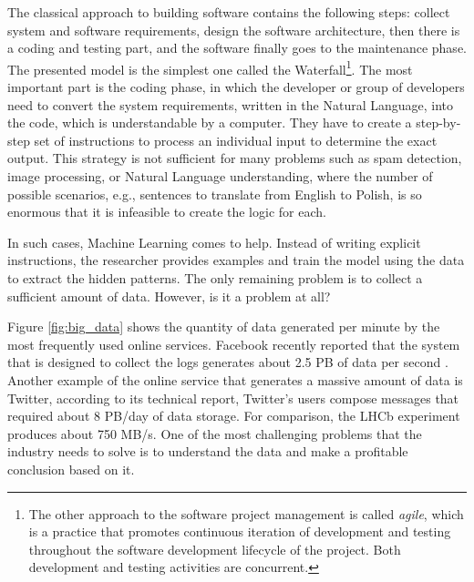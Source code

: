 The classical approach to building software contains the following steps: collect system and software requirements,
design the software architecture, then there is a coding and testing part, and the software finally goes to the maintenance phase. The presented model is the simplest one called the Waterfall\footnote{The other approach to the software project management is called \textit{agile}, which is a practice that promotes continuous iteration of development and testing throughout the software development lifecycle of the project. Both development and testing activities are concurrent.}. The most important part is the coding phase, in which the developer or group of developers need to convert the system requirements, written in the Natural Language, into the code, which is understandable by a computer. They have to create a step-by-step set of instructions to process an individual input to determine the exact output. 
This strategy is not sufficient for many problems such as spam detection, image processing, or Natural Language understanding, where the number of possible scenarios, e.g., sentences to translate from English to Polish, is so enormous that it is infeasible to create the logic for each. 

In such cases, Machine Learning comes to help. Instead of writing explicit instructions, the researcher provides examples and train the model using the data to extract the hidden patterns. The only remaining problem is to collect a sufficient amount of data. However, is it a problem at all? 

Figure \ref{fig:big_data} shows the quantity of data generated per minute by the most frequently used online services. Facebook recently reported that the system that is designed to collect the logs generates about 2.5 PB of data per second \cite{facebook}. Another example of the online service that generates a massive amount of data is Twitter, according to its technical report, Twitter's users compose messages that required about 8 PB/day of data storage. For comparison, the LHCb experiment produces about 750 MB/s. One of the most challenging problems that the industry needs to solve is to understand the data and make a profitable conclusion based on it.

